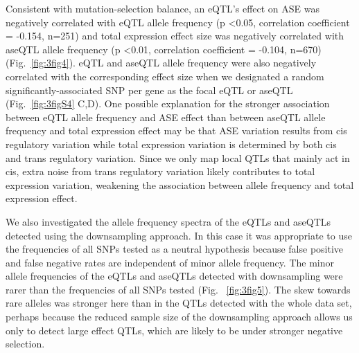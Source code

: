 Consistent with mutation-selection balance, an eQTL’s effect on ASE was negatively correlated with eQTL allele frequency (p \textless 0.05, correlation coefficient = -0.154, n=251) and total expression effect size was negatively correlated with aseQTL allele frequency (p \textless 0.01, correlation coefficient = -0.104, n=670) (Fig.~\ref{fig:3fig4}). eQTL and aseQTL allele frequency were also negatively correlated with the corresponding effect size when we designated a random significantly-associated SNP per gene as the focal eQTL or aseQTL (Fig.~\ref{fig:3figS4} C,D). One possible explanation for the stronger association between eQTL allele frequency and ASE effect than between aseQTL allele frequency and total expression effect may be that ASE variation results from cis regulatory variation while total expression variation is determined by both cis and trans regulatory variation. Since we only map local QTLs that mainly act in cis, extra noise from trans regulatory variation likely contributes to total expression variation, weakening the association between allele frequency and total expression effect.

We also investigated the allele frequency spectra of the eQTLs and aseQTLs detected using the downsampling approach. In this case it was appropriate to use the frequencies of all SNPs tested as a neutral hypothesis because false positive and false negative rates are independent of minor allele frequency. The minor allele frequencies of the eQTLs and aseQTLs detected with downsampling were rarer than the frequencies of all SNPs tested (Fig. ~\ref{fig:3fig5}). The skew towards rare alleles was stronger here than in the QTLs detected with the whole data set, perhaps because the reduced sample size of the downsampling approach allows us only to detect large effect QTLs, which are likely to be under stronger negative selection. 

